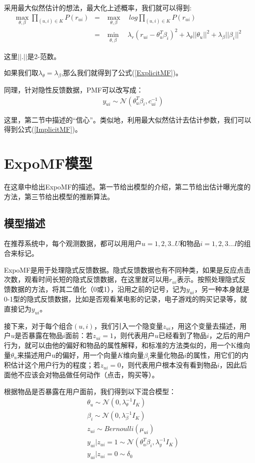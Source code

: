 \documentclass[notitlepage,cs4size,punct,oneside]{ctexrep}
\numberwithin{equation}{chapter}
\theoremstyle{mystyle}
\begin{document}
\par
采用最大似然估计的想法，最大化上述概率，我们就可以得到:
\begin{eqnarray*}
\max_{\theta,\beta}\prod _{(u,i)\in K} P(r_{ui})&=& \max_{\theta,\beta}\quad log\prod _{(u,i)\in K} P(r_{ui})\\
&=& \min_{\theta,\beta}\quad \lambda_r(r_{ui}-\theta_u^T\beta_i)^2+\lambda_\theta||\theta_u||^2+\lambda_\beta||\beta_i||^2
\end{eqnarray*}

这里$||.||$是2-范数。

\par 
如果我们取$\lambda_\theta=\lambda_\beta$,那么我们就得到了公式(\ref{ExplicitMF})。
\par
同理，针对隐性反馈数据，PMF可以改写成：
\begin{eqnarray*}
&&y_{ui} \sim \mathcal{N}(\theta_u^T\beta_i,c_{ui}^{-1} )
\end{eqnarray*}

\par
这里，第二节中描述的“信心”。类似地，利用最大似然估计去估计参数，我们可以得到公式(\ref{ImplicitMF})。



\chapter{ExpoMF模型}
在这章中给出ExpoMF的描述。第一节给出模型的介绍，第二节给出估计曝光度的方法，第三节给出模型的推断算法。
\section{模型描述}
在推荐系统中，每个观测数据，都可以用用户$u=1,2,3..U$和物品$i=1,2,3…I$的组合来标记。
\par
ExpoMF是用于处理隐式反馈数据。隐式反馈数据也有不同种类，如果是反应点击次数，观看时间长短的隐式反馈数据，在这里就可以用$r_{ui}$表示。按照处理隐式反馈数据的方法，将其二值化（0或1），沿用之前的记号，记为$y_{ui}$，另一种本身就是0-1型的隐式反馈数据，比如是否观看某电影的记录，电子游戏的购买记录等，就直接记为$y_{ui}$。
\par
接下来，对于每个组合$(u,i)$，我们引入一个隐变量$z_{ui}$，用这个变量去描述，用户$u$是否暴露在物品$i$面前：若$z_{ui}=1$，则代表用户$u$已经看到了物品$i$，之后的用户行为，就可以由他的偏好和物品的属性解释，和标准的方法类似的，用一个K维向量$\theta_u$来描述用户u的偏好，用一个向量$K$维向量$\beta_i$来量化物品$i$的属性，用它们的内积估计这个用户行为的程度；若$z_{ui}=0$，则代表用户根本没有看到物品$i$，因此后面他不应该会对物品做任何动作（点击，购买等）。
\par
根据物品是否暴露在用户面前，我们得到以下混合模型：
\begin{eqnarray*}
&&\theta_u  \sim  \mathcal{N}(0,\lambda_\theta^{-1} I_K)\\
&&\beta_i  \sim  \mathcal{N}(0,\lambda_\beta^{-1} I_K)\\
&&z_{ui} \sim Bernoulli(\mu_{ui})\\
&&y_{ui}|z_{ui}=1 \sim \mathcal{N}(\theta_u^T\beta_i,\lambda_y^{-1} I_K)\\
&&y_{ui}|z_{ui}=0 \sim \delta_0
\end{eqnarray*}
\end{document}
